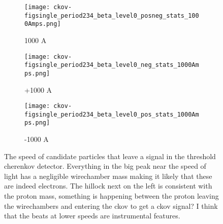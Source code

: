    \begin{figure}[h]	
 \centering   
               \begin{subfigure}[b]{0.3\textwidth}
            \centering
            \texttt{[image: ckov-figsingle\_period234\_beta\_level0\_posneg\_stats\_1000Amps.png]}
            \caption{1000 A}
            \end{subfigure}
             \hfill   
            \begin{subfigure}[b]{0.3\textwidth}
            \centering
            \texttt{[image: ckov-figsingle\_period234\_beta\_level0\_neg\_stats\_1000Amps.png]}
            \caption{+1000 A}
            \end{subfigure}
             \hfill   
            \begin{subfigure}[b]{0.3\textwidth}
            \centering
            \texttt{[image: ckov-figsingle\_period234\_beta\_level0\_pos\_stats\_1000Amps.png]}
            \caption{-1000 A}
            \end{subfigure}
  

            
\caption{The speed of candidate particles that leave a signal in the threshold cherenkov detector. Everything in the big peak near the speed of light has a negligible wirechamber mass making it likely that these are indeed electrons. The hillock next on the left is consistent with the proton mass, something is happening between the proton leaving the wirechambers and entering the ckov  to get a ckov signal? I think that the beats at lower speeds are instrumental features.  }
\label{fig_beta-ckov}
  \end{figure}
  


